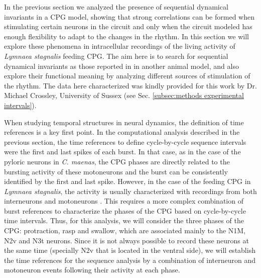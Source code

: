 In the previous section we analyzed the presence of sequential dynamical invariants in a CPG model, showing that strong correlations can be formed when stimulating certain neurons in the circuit and only when the circuit modeled has enough flexibility to adapt to the changes in the rhythm. In this section we will explore these phenomena in intracellular recordings of the living activity of \textit{Lymnaea stagnalis} feeding CPG. The aim here is to search for sequential dynamical invariants as those reported in \textcite{elices_robust_2019} in another animal model, and also explore their functional meaning by analyzing different sources of stimulation of the rhythm. The data here characterized was kindly provided for this work by Dr. Michael Crossley, University of Sussex (see Sec. \ref{subsec:methods experimental intervals}).

When studying temporal structures in neural dynamics, the definition of time references is a key first point. In the computational analysis described in the previous section, the time references to define cycle-by-cycle sequence intervals were the first and last spikes of each burst. In that case, as in the case of the pyloric neurons in \textit{C. maenas}, the CPG phases are directly related to the bursting activity of these motoneurons and the burst can be consistently identified by the first and last spike. However, in the case of the feeding CPG in \textit{Lymnaea stagnalis}, the activity is usually characterized with recordings from both interneurons and motoneurons \parencite{elliott_interactions_1985, staras_patterngenerating_1998, benjamin_distributed_2012}. This requires a more complex combination of burst references to characterize the phases of the CPG based on cycle-by-cycle time intervals. Thus, for this analysis, we will consider the three phases of the CPG: protraction, rasp and swallow, which are associated mainly to the N1M, N2v and N3t neurons. Since it is not always possible to record these neurons at the same time (specially N2v that is located in the ventral side), we will establish the time references for the sequence analysis by a combination of interneuron and motoneuron events following their activity at each phase. 


